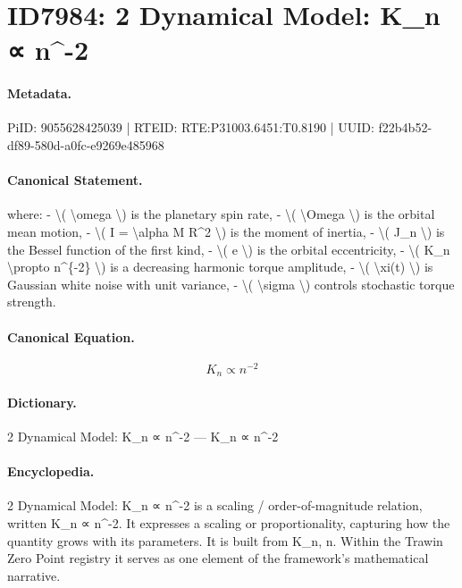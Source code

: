 \section*{ID7984: 2 Dynamical Model: K\_n ∝ n\textasciicircum{}-2}
\paragraph{Metadata.}
PiID: 9055628425039 | RTEID: RTE:P31003.6451:T0.8190 | UUID: f22b4b52-df89-580d-a0fc-e9269e485968

\paragraph{Canonical Statement.}
where: - \textbackslash{}( \textbackslash{}omega \textbackslash{}) is the planetary spin rate, - \textbackslash{}( \textbackslash{}Omega \textbackslash{}) is the orbital mean motion, - \textbackslash{}( I = \textbackslash{}alpha M R\textasciicircum{}2 \textbackslash{}) is the moment of inertia, - \textbackslash{}( J\_n \textbackslash{}) is the Bessel function of the first kind, - \textbackslash{}( e \textbackslash{}) is the orbital eccentricity, - \textbackslash{}( K\_n \textbackslash{}propto n\textasciicircum{}\{-2\} \textbackslash{}) is a decreasing harmonic torque amplitude, - \textbackslash{}( \textbackslash{}xi(t) \textbackslash{}) is Gaussian white noise with unit variance, - \textbackslash{}( \textbackslash{}sigma \textbackslash{}) controls stochastic torque strength.

\paragraph{Canonical Equation.}
\[
K_n \propto n^{-2}
\]

\paragraph{Dictionary.}
2 Dynamical Model: K\_n ∝ n\textasciicircum{}-2 — K\_n ∝ n\textasciicircum{}-2

\paragraph{Encyclopedia.}
2 Dynamical Model: K\_n ∝ n\textasciicircum{}-2 is a scaling / order-of-magnitude relation, written K\_n ∝ n\textasciicircum{}-2. It expresses a scaling or proportionality, capturing how the quantity grows with its parameters. It is built from K\_n, n. Within the Trawin Zero Point registry it serves as one element of the framework's mathematical narrative.
